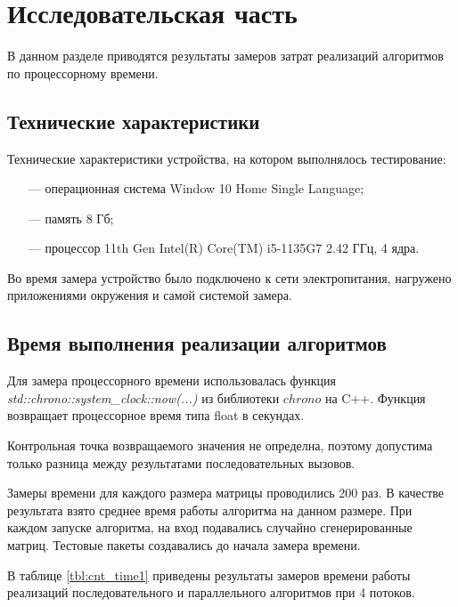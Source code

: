 \chapter{Исследовательская часть}

В данном разделе приводятся результаты замеров затрат реализаций алгоритмов по процессорному времени.

\section{Технические характеристики}

Технические характеристики устройства, на котором выполнялось тестирование:

\begin{itemize}
	\item[---] операционная система Window 10 Home Single Language;
	\item[---] память 8 Гб;
	\item[---] процессор 11th Gen Intel(R) Core(TM) i5-1135G7 2.42 ГГц, 4 ядра.
\end{itemize}

Во время замера устройство было подключено к сети электропитания, нагружено приложениями окружения и самой системой замера.

\section{Время выполнения реализации алгоритмов}

Для замера процессорного времени использовалась функция 
\\ \textit{std::chrono::system\_clock::now(...)} из библиотеки $chrono$ \cite{cpp-lang-chrono} на C++. Функция возвращает процессорное время типа float в секундах.

Контрольная точка возвращаемого значения не определна, поэтому допустима только разница между результатами последовательных вызовов.

Замеры времени для каждого размера матрицы проводились 200 раз. В качестве результата взято среднее время работы алгоритма на данном размере. При каждом запуске алгоритма, на вход подавались случайно сгенерированные матриц. Тестовые пакеты создавались до начала замера времени.

В таблице \ref{tbl:cnt_time1} приведены результаты замеров времени работы реализаций последовательного и параллельного алгоритмов при 4 потоков.

